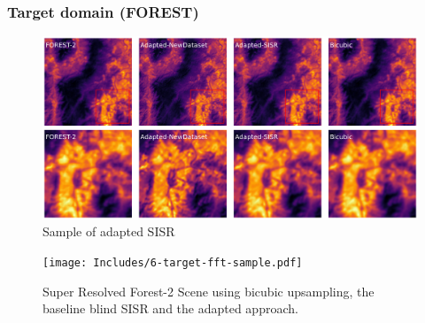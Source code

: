         \subsubsection{Target domain (FOREST)}
            \begin{figure}[ht!]
                \centering
                \includegraphics[scale=0.3]{Includes/6-target_prediction_sample.pdf}
                \caption{Sample of adapted SISR}
                \label{fig:6-target_prediction_sample}
            \end{figure}


            \begin{figure}[ht!]
                \centering
                \texttt{[image: Includes/6-target-fft-sample.pdf]}
                \caption{Super Resolved Forest-2 Scene using bicubic upsampling, the baseline blind SISR and the adapted approach.}
                \label{fig:6-target-fft-sample}
            \end{figure}


